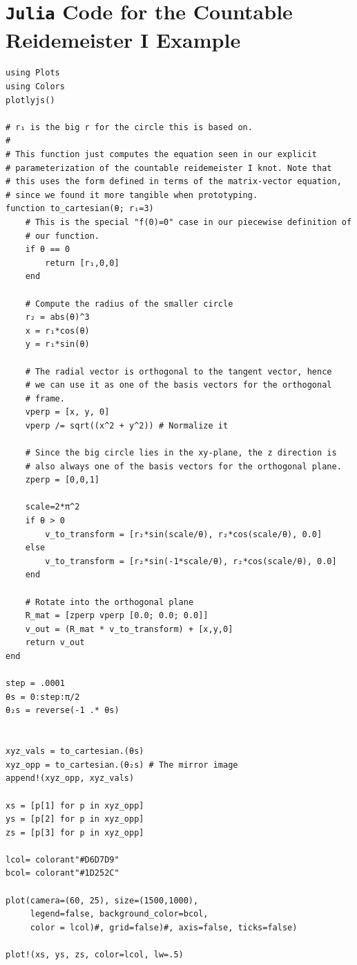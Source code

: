 \section{\texttt{Julia} Code for the Countable Reidemeister I
  Example}\label{sec:Julia-for-countable-reidemeister-i}
\begin{lstlisting}
using Plots
using Colors
plotlyjs()

# r₁ is the big r for the circle this is based on.
#
# This function just computes the equation seen in our explicit
# parameterization of the countable reidemeister I knot. Note that
# this uses the form defined in terms of the matrix-vector equation,
# since we found it more tangible when prototyping.
function to_cartesian(θ; r₁=3)
    # This is the special "f(0)=0" case in our piecewise definition of
    # our function.
    if θ == 0
        return [r₁,0,0]
    end

    # Compute the radius of the smaller circle
    r₂ = abs(θ)^3
    x = r₁*cos(θ)
    y = r₁*sin(θ)

    # The radial vector is orthogonal to the tangent vector, hence
    # we can use it as one of the basis vectors for the orthogonal
    # frame.
    vperp = [x, y, 0]
    vperp /= sqrt((x^2 + y^2)) # Normalize it

    # Since the big circle lies in the xy-plane, the z direction is
    # also always one of the basis vectors for the orthogonal plane.
    zperp = [0,0,1]

    scale=2*π^2
    if θ > 0
        v_to_transform = [r₂*sin(scale/θ), r₂*cos(scale/θ), 0.0]
    else
        v_to_transform = [r₂*sin(-1*scale/θ), r₂*cos(scale/θ), 0.0]
    end

    # Rotate into the orthogonal plane
    R_mat = [zperp vperp [0.0; 0.0; 0.0]]
    v_out = (R_mat * v_to_transform) + [x,y,0]
    return v_out
end

step = .0001
θs = 0:step:π/2
θ₂s = reverse(-1 .* θs)


xyz_vals = to_cartesian.(θs)
xyz_opp = to_cartesian.(θ₂s) # The mirror image
append!(xyz_opp, xyz_vals)

xs = [p[1] for p in xyz_opp]
ys = [p[2] for p in xyz_opp]
zs = [p[3] for p in xyz_opp]

lcol= colorant"#D6D7D9"
bcol= colorant"#1D252C"

plot(camera=(60, 25), size=(1500,1000),
     legend=false, background_color=bcol,
     color = lcol)#, grid=false)#, axis=false, ticks=false)

plot!(xs, ys, zs, color=lcol, lw=.5)
\end{lstlisting}

